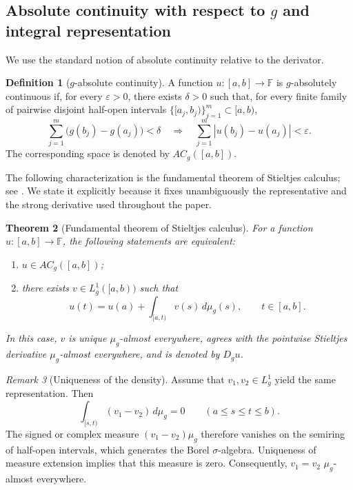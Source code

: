 \documentclass[preprint,12pt]{elsarticle}
\newtheorem{theorem}{Theorem}[section]
\theoremstyle{definition}
\newtheorem{definition}[theorem]{Definition}
\theoremstyle{remark}
\newtheorem{remark}[theorem]{Remark}
\newcommand{\F}{\mathbb F}
\newcommand{\abs}[1]{\left\lvert#1\right\rvert}
\begin{document}
\subsection{Absolute continuity with respect to $g$ and integral representation}

We use the standard notion of absolute continuity relative to the derivator.

\begin{definition}[$g$-absolute continuity]\label{def:ACg-standard}
A function $u:[a,b]\to\F$ is $g$-absolutely continuous if, for every $\varepsilon>0$, there exists $\delta>0$ such that, for every finite family of pairwise disjoint half-open intervals $\{[a_j,b_j)\}_{j=1}^m\subset[a,b)$,
\[
 \sum_{j=1}^m\bigl(g(b_j)-g(a_j)\bigr)<\delta
 \quad\Longrightarrow\quad
 \sum_{j=1}^m\abs{u(b_j)-u(a_j)}<\varepsilon.
\]
The corresponding space is denoted by $AC_g([a,b])$.
\end{definition}

The following characterization is the fundamental theorem of Stieltjes calculus; see \cite[Theorem~5.4]{LoRo14}. We state it explicitly because it fixes unambiguously the representative and the strong derivative used throughout the paper.

\begin{theorem}[Fundamental theorem of Stieltjes calculus]\label{thm:FTC-standard}
For a function $u:[a,b]\to\F$, the following statements are equivalent:
\begin{enumerate}[label=\roman*)]
 \item $u\in AC_g([a,b])$;
 \item there exists $v\in L_g^1([a,b))$ such that
 \begin{equation}\label{eq:AC-rep}
 u(t)=u(a)+\int_{[a,t)}v(s)\,d\mu_g(s),\qquad t\in[a,b].
 \end{equation}
\end{enumerate}
In this case, $v$ is unique $\mu_g$-almost everywhere, agrees with the pointwise Stieltjes derivative $\mu_g$-almost everywhere, and is denoted by $D_gu$.
\end{theorem}

\begin{remark}[Uniqueness of the density]\label{rem:density-unique}
Assume that $v_1,v_2\in L_g^1$ yield the same representation. Then
\[
 \int_{[s,t)}(v_1-v_2)\,d\mu_g=0
 \qquad(a\le s\le t\le b).
\]
The signed or complex measure $(v_1-v_2)\mu_g$ therefore vanishes on the semiring of half-open intervals, which generates the Borel $\sigma$-algebra. Uniqueness of measure extension implies that this measure is zero. Consequently, $v_1=v_2$ $\mu_g$-almost everywhere.
\end{remark}
\end{document}
